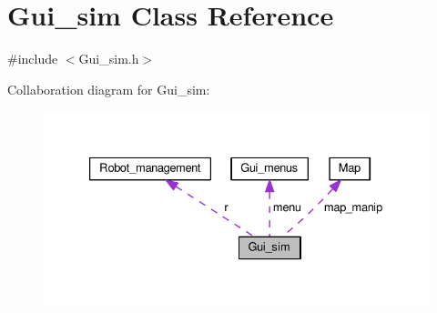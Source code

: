 \hypertarget{class_gui__sim}{\section{Gui\-\_\-sim Class Reference}
\label{class_gui__sim}
}


{\ttfamily \#include $<$Gui\-\_\-sim.\-h$>$}



Collaboration diagram for Gui\-\_\-sim\-:
\nopagebreak
\begin{figure}[H]
\begin{center}
\leavevmode
\includegraphics[width=333pt]{class_gui__sim__coll__graph}
\end{center}
\end{figure}
